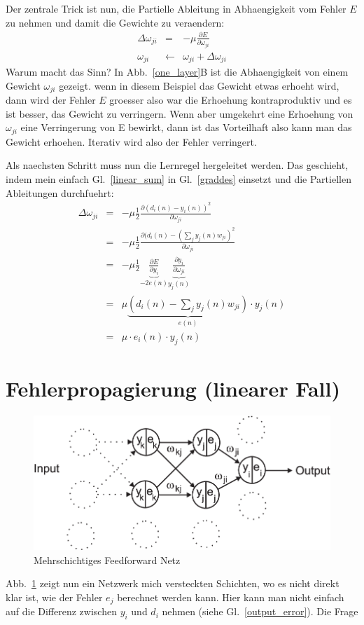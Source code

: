 \documentclass[12pt]{article}
\begin{document}
Der zentrale Trick ist nun, die Partielle Ableitung in Abhaengigkeit vom Fehler $E$ zu nehmen
und damit die Gewichte zu veraendern:
\begin{eqnarray}
  \Delta\omega_{ji} & = & - \mu \frac{\partial E}{\partial \omega_{ji}} \label{graddes} \\
  \omega_{ji} & \leftarrow & \omega_{ji} + \Delta\omega_{ji}
\end{eqnarray}
Warum macht das Sinn? In Abb.~\ref{one_layer}B ist die Abhaengigkeit von einem Gewicht
$\omega_{ji}$ gezeigt. wenn in diesem Beispiel das Gewicht etwas erhoeht wird, dann
wird der Fehler $E$ groesser also war die Erhoehung kontraproduktiv und es ist besser,
das Gewicht zu verringern. Wenn aber umgekehrt eine Erhoehung von $\omega_{ji}$ eine
Verringerung von E bewirkt, dann ist das Vorteilhaft also kann man das Gewicht erhoehen.
Iterativ wird also der Fehler verringert.

Als naechsten Schritt muss nun die Lernregel hergeleitet werden. Das geschieht, indem
mein einfach Gl.~\ref{linear_sum} in Gl.~\ref{graddes} einsetzt und die Partiellen Ableitungen
durchfuehrt:
\begin{eqnarray}
  \Delta\omega_{ji}
   & = & - \mu \frac{1}{2} \frac{\partial ( d_i(n) - y_i(n) )^2 }{\partial \omega_{ji}} \\
   & = & - \mu \frac{1}{2} \frac{\partial ( d_i(n) - \left( \sum_j y_j(n) w_{ji} \right)^2 }{\partial \omega_{ji}} \\
   & = & - \mu \frac{1}{2} \underbrace{\frac{\partial E}{\partial y_i}}_{-2e(n)} \underbrace{\frac{\partial y_i}{\partial \omega_{ji}}}_{y_j(n)} \\
  & = & \mu \underbrace{\left(d_i(n) - \sum_j y_j(n) w_{ji}\right)}_{e(n)} \cdot y_j(n) \\
  & = & \mu \cdot e_i(n) \cdot y_j(n)
\end{eqnarray}

\section{Fehlerpropagierung (linearer Fall)}
\begin{figure}[!hbt]
\begin{center}
\mbox{\includegraphics[width=\textwidth]{multi_layer}}
\end{center}
\caption{Mehrschichtiges Feedforward Netz
\label{multi_layer}}
\end{figure}

Abb.~\ref{multi_layer} zeigt nun ein Netzwerk mich versteckten Schichten, wo es
nicht direkt klar ist, wie der Fehler $e_j$ berechnet werden kann. Hier kann
man nicht einfach auf die Differenz zwischen $y_i$ und $d_i$ nehmen (siehe
Gl.~\ref{output_error}). Die Frage 
\end{document}
